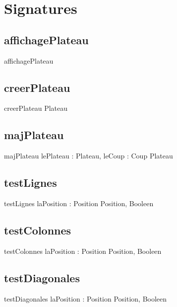



\section{Signatures}
	\subsection{affichagePlateau}
		\begin{algorithme}
			\signatureprocedure
				{affichagePlateau}
				{}
		\end{algorithme}
	\subsection{creerPlateau}
		\begin{algorithme}
			\signaturefonction
				{creerPlateau}
				{}
				{Plateau}
		\end{algorithme}
	\subsection{majPlateau}
		\begin{algorithme}
			\signaturefonction
				{majPlateau}
				{lePlateau : Plateau, leCoup : Coup}
				{Plateau}
		\end{algorithme}
	\subsection{testLignes}
		\begin{algorithme}
			\signaturefonction
				{testLignes}
				{laPosition : Position}
				{Position, Booleen}
		\end{algorithme}
	\subsection{testColonnes}
		\begin{algorithme}
			\signaturefonction
				{testColonnes}
				{laPosition : Position}
				{Position, Booleen}
		\end{algorithme}
	\subsection{testDiagonales}
		\begin{algorithme}
			\signaturefonction
				{testDiagonales}
				{laPosition : Position}
				{Position, Booleen}
		\end{algorithme}

